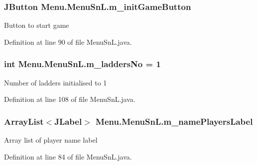 \subsubsection[{m\+\_\+init\+Game\+Button}]{\setlength{\rightskip}{0pt plus 5cm}J\+Button Menu.\+Menu\+Sn\+L.\+m\+\_\+init\+Game\+Button\hspace{0.3cm}{\ttfamily [private]}}\label{class_menu_1_1_menu_sn_l_ac45af15bf2aabd1916063700e1e44f08}
Button to start game 

Definition at line 90 of file Menu\+Sn\+L.\+java.

\hypertarget{class_menu_1_1_menu_sn_l_a30c87e65118ddf61c75fa3d9d9abe36e}{}
\subsubsection[{m\+\_\+ladders\+No}]{\setlength{\rightskip}{0pt plus 5cm}int Menu.\+Menu\+Sn\+L.\+m\+\_\+ladders\+No = 1\hspace{0.3cm}{\ttfamily [private]}}\label{class_menu_1_1_menu_sn_l_a30c87e65118ddf61c75fa3d9d9abe36e}
Number of ladders initialised to 1 

Definition at line 108 of file Menu\+Sn\+L.\+java.

\hypertarget{class_menu_1_1_menu_sn_l_ab29efffc6315a328efb34fed209c0677}{}
\subsubsection[{m\+\_\+name\+Players\+Label}]{\setlength{\rightskip}{0pt plus 5cm}Array\+List$<$J\+Label$>$ Menu.\+Menu\+Sn\+L.\+m\+\_\+name\+Players\+Label\hspace{0.3cm}{\ttfamily [private]}}\label{class_menu_1_1_menu_sn_l_ab29efffc6315a328efb34fed209c0677}
Array list of player name label 

Definition at line 84 of file Menu\+Sn\+L.\+java.

\hypertarget{class_menu_1_1_menu_sn_l_afee3307aa062adfbee4edd14484c8f2c}{}
